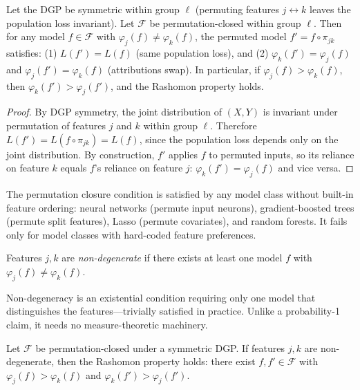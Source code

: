 \documentclass{jmlr}
\begin{document}
\begin{theorem}
\label{thm:rashomon-symmetry}
Let the DGP be symmetric within group $\ell$ (permuting features $j \leftrightarrow k$ leaves the population loss invariant). Let $\mathcal{F}$ be permutation-closed within group $\ell$. Then for any model $f \in \mathcal{F}$ with $\varphi_j(f) \neq \varphi_k(f)$, the permuted model $f' = f \circ \pi_{jk}$ satisfies: (1) $L(f') = L(f)$ (same population loss), and (2) $\varphi_k(f') = \varphi_j(f)$ and $\varphi_j(f') = \varphi_k(f)$ (attributions swap).
In particular, if $\varphi_j(f) > \varphi_k(f)$, then $\varphi_k(f') > \varphi_j(f')$, and the Rashomon property holds.
\end{theorem}

\begin{proof}
By DGP symmetry, the joint distribution of $(X, Y)$ is invariant under permutation of features $j$ and $k$ within group $\ell$. Therefore $L(f') = L(f \circ \pi_{jk}) = L(f)$, since the population loss depends only on the joint distribution. By construction, $f'$ applies $f$ to permuted inputs, so its reliance on feature $k$ equals $f$'s reliance on feature $j$: $\varphi_k(f') = \varphi_j(f)$ and vice versa.
\end{proof}

The permutation closure condition is satisfied by any model class without built-in feature ordering: neural networks (permute input neurons), gradient-boosted trees (permute split features), Lasso (permute covariates), and random forests. It fails only for model classes with hard-coded feature preferences.

\begin{definition}
\label{def:non-degeneracy}
Features $j, k$ are \emph{non-degenerate} if there exists at least one model $f$ with $\varphi_j(f) \neq \varphi_k(f)$.
\end{definition}

Non-degeneracy is an existential condition requiring only one model that distinguishes the features---trivially satisfied in practice. Unlike a probability-1 claim, it needs no measure-theoretic machinery.

\begin{theorem}
\label{thm:rashomon-inevitability}
Let $\mathcal{F}$ be permutation-closed under a symmetric DGP. If features $j, k$ are non-degenerate, then the Rashomon property holds: there exist $f, f' \in \mathcal{F}$ with $\varphi_j(f) > \varphi_k(f)$ and $\varphi_k(f') > \varphi_j(f')$.
\end{theorem}
\end{document}
